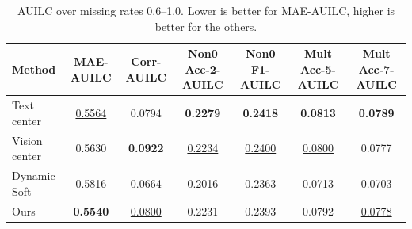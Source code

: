 \begin{table}[t]
\centering
\small
\begin{tabular}{lcccccc}
\toprule
Method & MAE-AUILC & Corr-AUILC & Non0 Acc-2-AUILC & Non0 F1-AUILC & Mult Acc-5-AUILC & Mult Acc-7-AUILC \\
\midrule
Text center & \underline{0.5564} & 0.0794 & \textbf{0.2279} & \textbf{0.2418} & \textbf{0.0813} & \textbf{0.0789} \\
Vision center & 0.5630 & \textbf{0.0922} & \underline{0.2234} & \underline{0.2400} & \underline{0.0800} & 0.0777 \\
Dynamic Soft & 0.5816 & 0.0664 & 0.2016 & 0.2363 & 0.0713 & 0.0703 \\
Ours & \textbf{0.5540} & \underline{0.0800} & 0.2231 & 0.2393 & 0.0792 & \underline{0.0778} \\
\bottomrule
\end{tabular}
\caption{AUILC over missing rates 0.6--1.0. Lower is better for MAE-AUILC, higher is better for the others.}
\label{tab:stress_auilc_06_10}
\end{table}